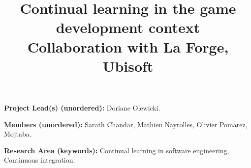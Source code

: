 \documentclass{article}
\title{Continual learning in the game development context\\Collaboration with La Forge, Ubisoft }
\begin{document}
\maketitle

\textbf{Project Lead(s) (unordered):} Doriane Olewicki.

\textbf{Members (unordered):} Sarath Chandar, Mathieu Nayrolles, Olivier Pomarez, Mojtaba.

\textbf{Research Area (keywords):} Continual learning in software engineering, Continuous integration.







% 

\end{document}
